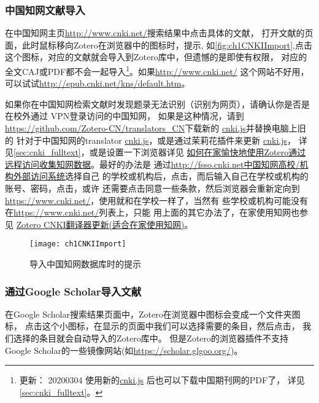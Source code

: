 \documentclass[cn,11pt,chinese]{elegantbook}
\begin{document}
	\subsubsection{中国知网文献导入} \label{sec:cnki}
	在中国知网主页\url{http://www.cnki.net/}搜索结果中点击具体的文献，
	打开文献的页面，此时鼠标移向Zotero在浏览器中的图标时，提示,
	如\autoref{fig:ch1CNKIImport},点击这个图标，对应的文献就会导入到Zotero库中，但遗憾的是即使有权限，
	对应的全文CAJ或PDF都不会一起导入\footnote{更新：
	20200304 使用新的\href{https://github.com/Zotero-CN/translators_CN}{cnki.js}
	后也可以下载中国期刊网的PDF了，
	详见\cref{sec:cnki_fulltext}。}。如果\url{http://www.cnki.net/}
	这个网站不好用，可以试试\url{http://epub.cnki.net/kns/default.htm}。

	如果你在中国知网检索文献时发现题录无法识别（识别为网页），请确认你是否是在校外通过
	VPN登录访问的中国知网， 如果是这种情况，请到
	\url{https://github.com/Zotero-CN/translators_CN}下载新的
	\href{https://github.com/Zotero-CN/translators_CN}{cnki.js}并替换电脑上旧的
	针对于中国知网的translator \href{https://github.com/Zotero-CN/translators_CN}
	{cnki.js}，或是通过茉莉花插件来更新
	\href{https://github.com/Zotero-CN/translators_CN}{cnki.js}，
	详见\cref{sec:cnki_fulltext}，或是设置一下浏览器详见
	\href{https://zhuanlan.zhihu.com/p/110731827}{如何在家愉快地使用Zotero通过远程访问收集知网数据}。最好的办法是
	通过\href{ http://fsso.cnki.net}{http://fsso.cnki.net中国知网高校/机构外部访问系统}选择自己
	的学校或机构后，点击，而后输入自己在学校或机构的账号、密码，点击，或许
	还需要点击同意一些条款，然后浏览器会重新定向到
	\href{www.cnki.net}{https://www.cnki.net/}，使用就和在学校一样了，当然有
	些学校或机构可能没有在\href{www.cnki.net}{https://www.cnki.net/}列表上，只能
	用上面的其它办法了，在家使用知网也参见
	\href{https://zhuanlan.zhihu.com/p/351547307}{Zotero CNKI翻译器更新(适合在家使用知网)}。
	\begin{figure}[htbp]
		\centering
		\texttt{[image: ch1CNKIImport]}
		\caption{导入中国知网数据库时的提示}
		\label{fig:ch1CNKIImport}
	\end{figure}
	\subsubsection{通过Google Scholar导入文献}
	在Google Scholar搜索结果页面中，Zotero在浏览器中图标会变成一个文件夹图标，
	点击这个小图标，在显示的页面中我们可以选择需要的条目，然后点击，
	我们选择的条目就会自动导入的Zotero库中。
	但是Zotero的浏览器插件不支持Google Scholar的一些镜像网站(如\url{https://scholar.glgoo.org/})。
\end{document}

